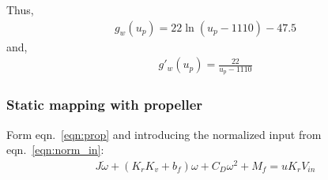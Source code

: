 Thus,
\begin{align*}
    \boxed{g_w(u_p) = 22 \ln(u_p - 1110)- 47.5 }
\end{align*}
and,
\begin{align*}
    g'_w(u_p) = \frac{22}{u_p - 1110}
\end{align*}


\subsubsection{Static mapping with propeller}
Form eqn.~\ref{eqn:prop} and introducing the normalized input from eqn.~\ref{eqn:norm_in}:
\begin{align*}
    J\dot \omega + (K_rK_v + b_f) \omega + C_D \omega^2 + M_f = u K_r V_{in}
\end{align*}
